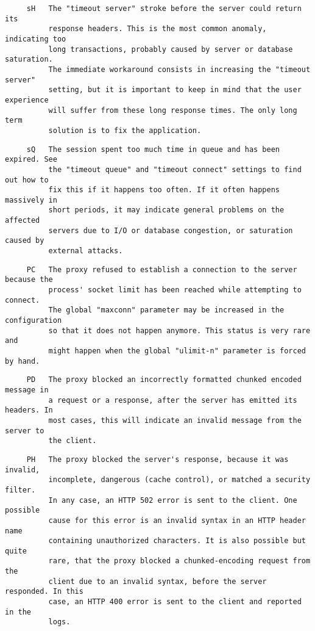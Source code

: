 \begin{verbatim}
     sH   The "timeout server" stroke before the server could return its
          response headers. This is the most common anomaly, indicating too
          long transactions, probably caused by server or database saturation.
          The immediate workaround consists in increasing the "timeout server"
          setting, but it is important to keep in mind that the user experience
          will suffer from these long response times. The only long term
          solution is to fix the application.
\end{verbatim}

\begin{verbatim}
     sQ   The session spent too much time in queue and has been expired. See
          the "timeout queue" and "timeout connect" settings to find out how to
          fix this if it happens too often. If it often happens massively in
          short periods, it may indicate general problems on the affected
          servers due to I/O or database congestion, or saturation caused by
          external attacks.
\end{verbatim}

\begin{verbatim}
     PC   The proxy refused to establish a connection to the server because the
          process' socket limit has been reached while attempting to connect.
          The global "maxconn" parameter may be increased in the configuration
          so that it does not happen anymore. This status is very rare and
          might happen when the global "ulimit-n" parameter is forced by hand.
\end{verbatim}

\begin{verbatim}
     PD   The proxy blocked an incorrectly formatted chunked encoded message in
          a request or a response, after the server has emitted its headers. In
          most cases, this will indicate an invalid message from the server to
          the client.
\end{verbatim}

\begin{verbatim}
     PH   The proxy blocked the server's response, because it was invalid,
          incomplete, dangerous (cache control), or matched a security filter.
          In any case, an HTTP 502 error is sent to the client. One possible
          cause for this error is an invalid syntax in an HTTP header name
          containing unauthorized characters. It is also possible but quite
          rare, that the proxy blocked a chunked-encoding request from the
          client due to an invalid syntax, before the server responded. In this
          case, an HTTP 400 error is sent to the client and reported in the
          logs.
\end{verbatim}

